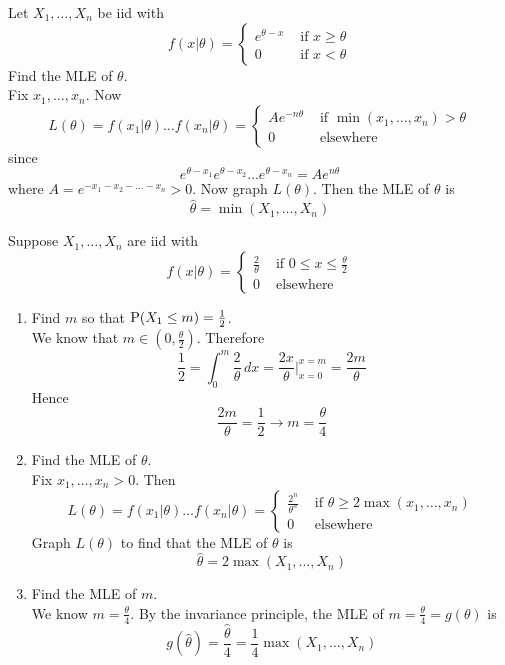 \documentclass[12pt]{article}
\begin{document}
\begin{question} Let $X_1,\dots,X_n$ be iid with $$f(x|\theta) = \begin{cases} e^{\theta - x} &\text{ if } x \geq \theta \\ 0 &\text{ if } x < \theta \end{cases} $$ 
Find the MLE of $\theta$. \\
Fix $x_1,\dots,x_n$. Now $$ L(\theta) = f(x_1|\theta) \dots f(x_n|\theta) = \begin{cases} Ae^{-n\theta} &\text{ if } \min(x_1,\dots,x_n) > \theta \\ 0&\text{ elsewhere } \end{cases} $$ 
since $$ e^{\theta-x_1} e^{\theta-x_2} \dots e^{\theta-x_n} = Ae^{n\theta}$$ where $A = e^{-x_1-x_2-\dots -x_n} > 0$. Now graph $L(\theta)$. Then the MLE of $\theta$ is $$\hat{\theta} = \min(X_1,\dots,X_n)$$ 
\end{question} 

\begin{question} Suppose $X_1,\dots, X_n$ are iid with $$f(x|\theta) = \begin{cases} \frac{2}{\theta} &\text{ if } 0 \leq x \leq \frac{\theta}{2} \\ 0 &\text{ elsewhere} \end{cases} $$ 
\begin{enumerate} 
\item Find $m$ so that $\mathrm{P}( X_1 \leq m ) = \frac{1}{2}$. \\
We know that $m \in (0, \frac{\theta}{2})$. Therefore $$ \frac{1}{2} = \int_0^m \frac{2}{\theta} \, dx = \frac{2x}{\theta}\Big|_{x = 0}^{x=m} = \frac{2m}{\theta} $$ Hence $$ \frac{2m}{\theta} = \frac{1}{2} \to m = \frac{\theta}{4} $$ 
\item Find the MLE of $\theta$. \\
Fix $x_1,\dots,x_n > 0$. Then $$ L(\theta) = f(x_1|\theta) \dots f(x_n | \theta) = \begin{cases} \frac{2^n}{\theta^n} &\text{ if } \theta \geq 2\max(x_1,\dots,x_n) \\ 0 &\text{ elsewhere } \end{cases} $$ 
Graph $L(\theta)$ to find that the MLE of $\theta$ is $$ \hat{\theta} = 2\max(X_1,\dots,X_n)$$ 
\item Find the MLE of $m$. \\ 
We know $m = \frac{\theta}{4}$. By the invariance principle, the MLE of $m = \frac{\theta}{4} = g(\theta)$ is $$g(\hat{\theta}) = \frac{\hat{\theta}}{4} = \frac{1}{4}\max(X_1,\dots,X_n) $$ 
\end{enumerate}
\end{question} 
\end{document}
